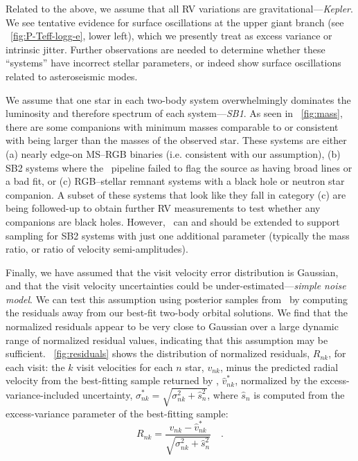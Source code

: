 \documentclass[modern, letterpaper]{aastex62}
\newcommand{\apogee}{\project{\acronym{APOGEE}}}
\newcommand{\thejoker}{\project{The~Joker}}
\begin{document}
Related to the above, we assume that all RV variations are
gravitational---\emph{Kepler}.
We see tentative evidence for surface oscillations at the upper giant branch
(see \figurename~\ref{fig:P-Teff-logg-e}, lower left), which we presently treat
as excess variance or intrinsic jitter.
Further observations are needed to determine whether these ``systems'' have
incorrect stellar parameters, or indeed show surface oscillations related to
asteroseismic modes.

We assume that one star in each two-body system overwhelmingly dominates the
luminosity and therefore spectrum of each system---\emph{SB1}.
As seen in \figurename~\ref{fig:mass}, there are some companions with minimum
masses comparable to or consistent with being larger than the masses of the
observed star.
These systems are either (a) nearly edge-on MS--RGB binaries (i.e. consistent
with our assumption), (b) SB2 systems where the \apogee\ pipeline failed to flag
the source as having broad lines or a bad fit, or (c) RGB--stellar remnant
systems with a black hole or neutron star companion.
A subset of these systems that look like they fall in category (c) are being
followed-up to obtain further RV measurements to test whether any companions are
black holes.
However, \thejoker\ can and should be extended to support sampling for SB2
systems with just one additional parameter (typically the mass ratio, or ratio
of velocity semi-amplitudes).

Finally, we have assumed that the visit velocity error distribution is Gaussian,
and that the visit velocity uncertainties could be
under-estimated---\emph{simple noise model}.
We can test this assumption using posterior samples from \thejoker\ by computing
the residuals away from our best-fit two-body orbital solutions.
We find that the normalized residuals appear to be very close to Gaussian over a
large dynamic range of normalized residual values, indicating that this
assumption may be sufficient.
\figurename~\ref{fig:residuals} shows the distribution of normalized residuals,
$R_{nk}$, for each visit: the $k$ visit velocities for each $n$ star, $v_{nk}$,
minus the predicted radial velocity from the best-fitting sample returned by
\thejoker, $\hat{v}^*_{nk}$, normalized by the excess-variance-included
uncertainty, $\sigma_{nk}^* = \sqrt{\sigma_{nk}^2 + \hat{s}_{n}^2}$, where
$\hat{s}_{n}$ is computed from the excess-variance parameter of the best-fitting
sample:
\begin{equation}
    R_{nk} = \frac{v_{nk} - \hat{v}^*_{nk}}{\sqrt{\sigma_{nk}^2 +
    \hat{s}_{n}^2}} \quad . \label{eq:normresid}
\end{equation}
\end{document}
